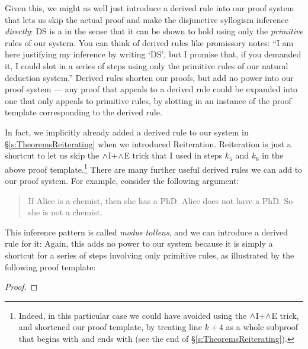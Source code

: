 Given this, we might as well just introduce a derived rule into our proof system that lets us skip the actual proof and make the disjunctive syllogism inference \emph{directly}:
DS is a  in the sense that it can be shown to hold using only the \emph{primitive} rules of our system.    You can think of derived rules like promissory notes: ``I am here justifying my inference by writing `DS', but I promise that, if you demanded it, I could slot in a series of steps using only the primitive rules of our natural deduction system.''  Derived rules shorten our proofs, but add no power into our proof system --- any proof that appeals to a derived rule could be expanded into one that only appeals to primitive rules, by slotting in an instance of the proof template corresponding to the derived rule.

In fact, we implicitly already added a derived rule to our system in \S\ref{s:TheoremsReiterating} when we introduced Reiteration.  Reiteration is just a shortcut to let us skip the $\wedge$I+$\wedge$E trick that I used in steps $k_5$ and $k_6$ in the above proof template.\footnote{Indeed, in this particular case we could have avoided using the $\wedge$I+$\wedge$E trick, and shortened our proof template, by treating line $k+4$ as a whole subproof that begins with  and ends with  (see the end of \S\ref{s:TheoremsReiterating}).}  There are many further useful derived rules we can add to our proof system.  For example, consider the following argument:
	\begin{quote}
		If Alice is a chemist, then she has a PhD. Alice does not have a PhD. So she is not a chemist.
	\end{quote}
This inference pattern is called \emph{modus tollens}, and we can introduce a derived rule for it:
Again, this adds no power to our system because it is simply a shortcut for a series of steps involving only primitive rules, as illustrated by the following proof template:
\begin{proof}
		\open
		\close
\end{proof}

